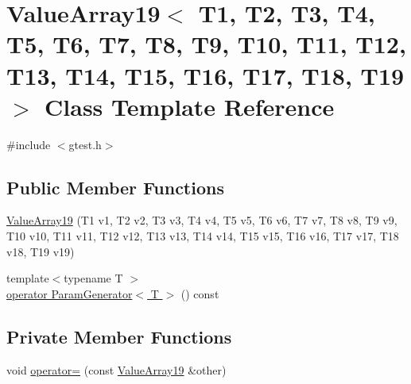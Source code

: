 \hypertarget{classtesting_1_1internal_1_1ValueArray19}{\section{\-Value\-Array19$<$ \-T1, \-T2, \-T3, \-T4, \-T5, \-T6, \-T7, \-T8, \-T9, \-T10, \-T11, \-T12, \-T13, \-T14, \-T15, \-T16, \-T17, \-T18, \-T19 $>$ \-Class \-Template \-Reference}
\label{de/dc6/classtesting_1_1internal_1_1ValueArray19}
}


{\ttfamily \#include $<$gtest.\-h$>$}

\subsection*{\-Public \-Member \-Functions}
\begin{DoxyCompactItemize}
\item 
\hyperlink{classtesting_1_1internal_1_1ValueArray19_a28ba35d2c634841990411f11105328c4}{\-Value\-Array19} (\-T1 v1, \-T2 v2, \-T3 v3, \-T4 v4, \-T5 v5, \-T6 v6, \-T7 v7, \-T8 v8, \-T9 v9, \-T10 v10, \-T11 v11, \-T12 v12, \-T13 v13, \-T14 v14, \-T15 v15, \-T16 v16, \-T17 v17, \-T18 v18, \-T19 v19)
\item 
{\footnotesize template$<$typename T $>$ }\\\hyperlink{classtesting_1_1internal_1_1ValueArray19_a08ef46fa12c9dd8ef6fc630baeea89b7}{operator Param\-Generator$<$ T $>$} () const 
\end{DoxyCompactItemize}
\subsection*{\-Private \-Member \-Functions}
\begin{DoxyCompactItemize}
\item 
void \hyperlink{classtesting_1_1internal_1_1ValueArray19_a954fc0d4fcf11051a6e3a7927e8d04ef}{operator=} (const \hyperlink{classtesting_1_1internal_1_1ValueArray19}{\-Value\-Array19} \&other)
\end{DoxyCompactItemize}
